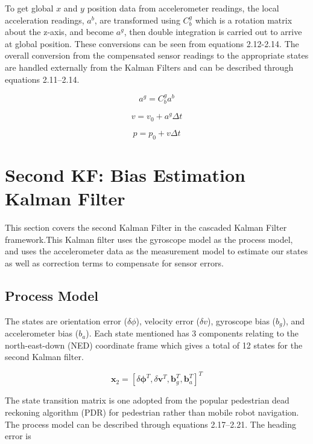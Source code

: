 To get global $x$ and $y$ position data from 
accelerometer readings, the local acceleration readings, $a^b$, are transformed using 
$C^g_b$ which is a rotation matrix about the z-axis, and become $a^g$, then double 
integration is carried out to arrive at global position. These conversions can be 
seen from equations 2.12-2.14. The overall conversion from the 
compensated sensor readings to the appropriate states are handled externally from 
the Kalman Filters and can be described through equations 2.11--2.14.

\begin{equation}
  a^g =  C^g_b a^b
\end{equation}

\begin{equation}
  v = v_0 + a^g \Delta t
\end{equation}

\begin{equation}
  p = p_0 + v \Delta t
\end{equation}


\section{Second KF: Bias Estimation Kalman Filter}

This section covers the second Kalman Filter in the cascaded Kalman Filter 
framework.This Kalman filter uses the gyroscope model as the process model, 
and uses the accelerometer data as the measurement model to estimate our 
states as well as correction terms to compensate for sensor errors.

\subsection{Process Model}

The states are orientation error ($\delta\phi$), velocity error ($\delta v$), 
gyroscope bias ($b_g$), and accelerometer bias ($b_a$). Each state mentioned has 3 
components relating to the north-east-down (NED) coordinate frame which gives a 
total of 12 states for the second Kalman filter.

\begin{equation}
  \boldsymbol{x}_2 = [\delta\boldsymbol{\phi}^T, \delta\boldsymbol{v}^T,
       \boldsymbol{b}^T_g, \boldsymbol{b}^T_a]^T
\end{equation}

The state transition matrix is one adopted from the popular pedestrian dead 
reckoning algorithm (PDR) for pedestrian rather than mobile robot navigation. The 
process model can be described through equations 2.17--2.21. The heading error is 

